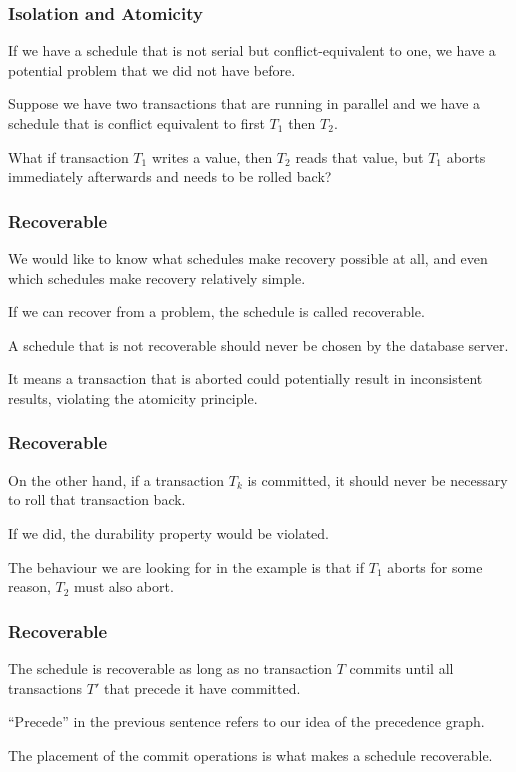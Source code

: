 \begin{frame}
\frametitle{Isolation and Atomicity}

If we have a schedule that is not serial but conflict-equivalent to one, we have a potential problem that we did not have before. 

Suppose we have two transactions that are running in parallel and we have a schedule that is conflict equivalent to first $T_{1}$ then $T_{2}$. 

What if transaction $T_{1}$ writes a value, then $T_{2}$ reads that value, but $T_{1}$ aborts immediately afterwards and needs to be rolled back? 

\end{frame}

\begin{frame}
\frametitle{Recoverable}

We would like to know what schedules make recovery possible at all, and even which schedules make recovery relatively simple. 

If we can recover from a problem, the schedule is called \alert{recoverable}. 

A schedule that is not recoverable should never be chosen by the database server.

It means a transaction that is aborted could potentially result in inconsistent results, violating the atomicity principle.

\end{frame}

\begin{frame}
\frametitle{Recoverable}

On the other hand, if a transaction $T_{k}$ is committed, it should never be necessary to roll that transaction back. 

If we did, the durability property would be violated. 

The behaviour we are looking for in the example is that if $T_{1}$ aborts for some reason, $T_{2}$ must also abort.

\end{frame}

\begin{frame}
\frametitle{Recoverable}

The schedule is recoverable as long as no transaction $T$ commits until all transactions $T'$ that precede it have committed. 

``Precede'' in the previous sentence refers to our idea of the precedence graph.

The placement of the commit operations is what makes a schedule recoverable.

\end{frame}



